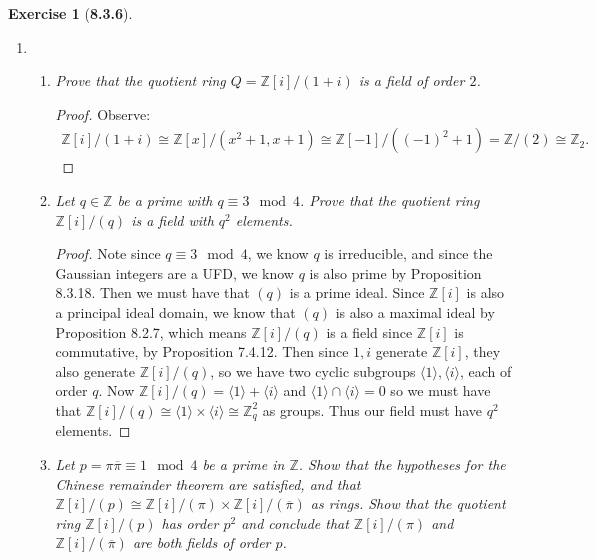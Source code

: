\documentclass[10pt,oneside,reqno]{amsart}
\theoremstyle{plain}
\newtheorem*{e}{Exercise}
\theoremstyle{definition}
\begin{document}
\begin{e}[\textbf{8.3.6}]
\end{e}
\begin{enumerate}
\item[]
\begin{enumerate}
\item \textit{Prove that the quotient ring $Q = \mathbb{Z}[i]/(1 + i)$ is a field of order $2$. }\\

\begin{proof}
Observe:
\begin{equation}
\begin{aligned}
\mathbb{Z}[i]/(1 + i) \cong \mathbb{Z}[x]/(x^2 + 1, x + 1) \cong \mathbb{Z}[-1]/((-1)^2 + 1)= \mathbb{Z}/(2) \cong \mathbb{Z}_2. 
\end{aligned}
\end{equation}
\end{proof}
\vspace{3mm}
\item \textit{Let $q \in \mathbb{Z}$ be a prime with $q \equiv 3\mod 4$. Prove that the quotient ring $\mathbb{Z}[i]/(q)$ is a field with $q^2$ elements. \\}
\begin{proof}
Note since $q \equiv 3 \mod 4$, we know $q$ is irreducible, and since the Gaussian integers are a UFD, we know $q$ is also prime by Proposition 8.3.18. Then we must have that $(q)$ is a prime ideal. Since $\mathbb{Z}[i]$ is also a principal ideal domain, we know that $(q)$ is also a maximal ideal by Proposition 8.2.7, which means $\mathbb{Z}[i]/(q)$ is a field since $\mathbb{Z}[i]$ is commutative, by Proposition 7.4.12. Then since $1,i$ generate $\mathbb{Z}[i]$, they also generate $\mathbb{Z}[i]/(q)$, so we have two cyclic subgroups $\langle 1 \rangle, \langle i \rangle$, each of order $q$. Now $\mathbb{Z}[i]/(q) = \langle 1 \rangle +  \langle i \rangle$ and $ \langle 1 \rangle \cap \langle i \rangle = 0$ so we must have that $\mathbb{Z}[i]/(q) \cong \langle 1 \rangle \times  \langle i \rangle \cong \mathbb{Z}_q^2$ as groups. Thus our field must have $q^2$ elements. 
\end{proof}


\vspace{3mm}
\item \textit{Let $p = \pi \overline{\pi} \equiv 1 \mod 4$ be a prime in $\mathbb{Z}$. Show that the hypotheses for the Chinese remainder theorem are satisfied, and that $\mathbb{Z}[i]/(p) \cong \mathbb{Z}[i]/(\pi) \times \mathbb{Z}[i]/(\overline{\pi})$ as rings. Show that the quotient ring $\mathbb{Z}[i]/(p)$ has order $p^2$ and conclude that $\mathbb{Z}[i]/(\pi)$ and $ \mathbb{Z}[i]/(\overline{\pi})$ are both fields of order $p$. }\\


\end{enumerate}
\end{enumerate}
\end{document}
